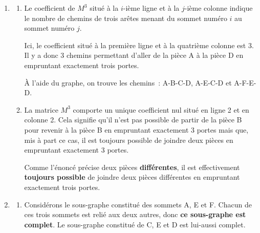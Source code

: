 \begin{corrige}
\begin{enumerate}
          \item %
         
          \begin{enumerate}[label=\alph*.]
               \item %
              
               Le coefficient de $M^3$ situé à la $i$-ième ligne et à la $j$-ième colonne indique le nombre de chemins de trois arêtes menant du sommet numéro $i$ au sommet numéro $j$.
              
               Ici, le coefficient situé à la première ligne et à la quatrième colonne est 3. Il y a donc 3 chemins permettant d'aller de la pièce A à la pièce D en empruntant exactement trois portes.
              
               \`A l'aide du graphe, on trouve les chemins~: A-B-C-D, A-E-C-D et A-F-E-D.
              
              
               \item %
              
               La matrice $M^3$ comporte un unique coefficient nul situé en ligne 2 et en colonne 2. Cela signifie qu'il n'est pas possible de partir de la pièce B pour revenir à la pièce B en empruntant exactement 3 portes mais que, mis à part ce cas, il est toujours possible de joindre deux pièces en empruntant exactement 3 portes.
              
               Comme l'énoncé précise deux pièces \textbf{différentes}, il est effectivement \textbf{toujours possible} de joindre deux pièces différentes en empruntant exactement trois portes.
          \end{enumerate}
         
          \item %
         
          \begin{enumerate}[label=\alph*.]
               \item %
               Considérons le sous-graphe constitué des sommets A, E et F. Chacun de ces trois sommets est relié aux deux autres, donc \textbf{ce sous-graphe est complet}. Le sous-graphe constitué de C, E et D est lui-aussi complet.
              

\end{enumerate}
\end{enumerate}
\end{corrige}
